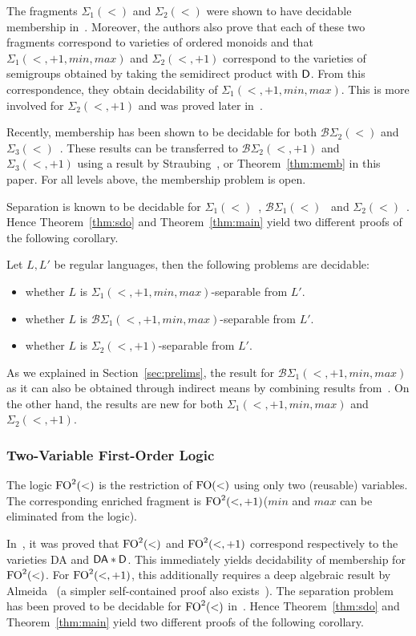 \documentclass[a4paper,USenglish]{lipics}
\newcommand\Dbf{\ensuremath{{\sf D}}\xspace}
\newcommand{\plus}{\ensuremath{+1,min,max}}
\newcommand{\sio}[1]{\ensuremath{\Sigma_{#1}(<)}\xspace}
\newcommand{\sip}[1]{\ensuremath{\Sigma_{#1}(<,\plus)}\xspace}
\newcommand{\bso}[1]{\ensuremath{\mathcal{B}\Sigma_{#1}(<)}\xspace}
\newcommand{\bsp}[1]{\ensuremath{\mathcal{B}\Sigma_{#1}(<,\plus)}\xspace}
\newcommand{\sdp}{\ensuremath{\Sigma_{2}(<,+1)}\xspace}
\newcommand{\bdp}{\ensuremath{\mathcal{B}\Sigma_{2}(<,+1)}\xspace}
\newcommand{\stp}{\ensuremath{\Sigma_{3}(<,+1)}\xspace}
\newcommand{\sdo}{\sio{2}}
\newcommand{\fow}{\ensuremath{\textup{FO}(<)}\xspace}
\newcommand{\fod}{\ensuremath{\textup{FO}^2(<)}\xspace}
\newcommand{\fodp}{\ensuremath{\textup{FO}^2(<,+1)}\xspace}
\theoremstyle{plain}
\begin{document}
The fragments {\sio 1} and {\sio 2} were shown to have decidable
membership in~\cite{pwdelta}. Moreover, the authors also prove that
each of these two fragments correspond to varieties of ordered monoids and that
{\sip 1} and \sdp correspond to the varieties of semigroups obtained
by taking the semidirect product with \Dbf. From this correspondence,
they obtain decidability of {\sip 1}. This is more involved for \sdp
and was proved later in~\cite{glasser-dd3/2}.

Recently, membership has been shown to be decidable for both {\bso 2}
and {\sio 3}~\cite{PZ:icalp14}. These results can be transferred to
\bdp and \stp using a result by Straubing~\cite{Str85}, or
Theorem~\ref{thm:memb} in this paper. For all levels
above, the membership problem is open.

Separation is known to be decidable for {\sio 1}~\cite{sep_icalp13},
{\bso   1}~\cite{DBLP:conf/mfcs/PlaceRZ13,sep_icalp13} and
\sdo~\cite{PZ:icalp14}. Hence Theorem~\ref{thm:sdo} and
Theorem~\ref{thm:main} yield two different proofs of the following
corollary.

\begin{corollary}
  Let $L,L'$ be regular languages, then the following problems are
  decidable:
  \begin{itemize}
  \item whether $L$ is $\sip 1$-separable from $L'$.
  \item whether $L$ is $\bsp 1$-separable from $L'$.
  \item whether $L$ is \sdp-separable from $L'$.
  \end{itemize}
\end{corollary}

As we explained in Section~\ref{sec:prelims}, the result for {\bsp 1}
as it can also be obtained through indirect means by
combining results
from~\cite{MR1709911,Steinberg:delay-pointlikes:2001}. On the other
hand, the results are new for both $\sip 1$ and \sdp.

\subsubsection{Two-Variable First-Order Logic}
\label{sec:two-variable-first}
The logic \fod is the restriction of \fow using only two (reusable)
variables. The corresponding enriched fragment is \fodp ($min$ and $max$ can
be eliminated from the logic).

In~\cite{TW-FO2}, it was proved that \fod and \fodp correspond
respectively to the varieties {\sf DA} and ${\sf DA} * \Dbf$. This
immediately yields decidability of membership for \fod. For \fodp,
this additionally requires a deep algebraic result by
Almeida~\cite{Almeida:1996c} (a simpler self-contained proof also
exists~\cite{PSDAD}). The separation problem has been proved to be
decidable for \fod in~\cite{DBLP:conf/mfcs/PlaceRZ13}. Hence
Theorem~\ref{thm:sdo} and Theorem~\ref{thm:main} yield two different
proofs of the following corollary.
\end{document}
